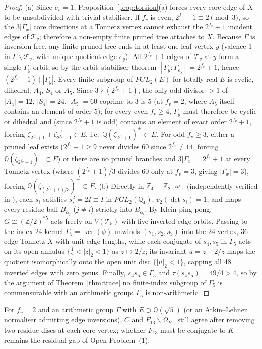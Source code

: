 \documentclass[11pt]{amsart}
\numberwithin{equation}{section}
\theoremstyle{plain}
\theoremstyle{definition}\newtheorem{definition}[theorem]{Definition}
\theoremstyle{remark}\newtheorem{remark}[theorem]{Remark}
\newcommand{\Z}{\mathbb{Z}}\newcommand{\Q}{\mathbb{Q}}\newcommand{\C}{\mathbb{C}}\newcommand{\F}{\mathbb{F}}\newcommand{\R}{\mathbb{R}}
\begin{document}
\begin{proof}
(a) Since $e_v=1$, Proposition~\ref{prop:torsion}(a) forces every core edge of $X$ to be unsubdivided with trivial stabiliser. If $f_v$ is even, $2^{f_v}+1\equiv2\pmod3$, so the $3|\Gamma_x|$ core directions at a Tonnetz vertex cannot exhaust the $2^{f_v}+1$ incident edges of $\mathcal T_v$; therefore a non-empty finite pruned tree attaches to $X$. Because $\Gamma$ is inversion-free, any finite pruned tree ends in at least one leaf vertex $y$ (valence 1 in $\Gamma\backslash\mathcal T_v$, with unique quotient edge $e_y$). All $2^{f_v}+1$ edges of $\mathcal T_v$ at $y$ form a single $\Gamma_y$-orbit, so by the orbit--stabiliser theorem $[\Gamma_y:\Gamma_{e_y}]=2^{f_v}+1$, hence $(2^{f_v}+1)\mid|\Gamma_y|$. Every finite subgroup of $PGL_2(E)$ for totally real $E$ is cyclic, dihedral, $A_4$, $S_4$ or $A_5$. Since $3\nmid(2^{f_v}+1)$, the only odd divisor $>1$ of $|A_4|=12$, $|S_4|=24$, $|A_5|=60$ coprime to $3$ is $5$ (at $f_v=2$, where $A_5$ itself contains an element of order $5$); for every even $f_v\ge4$, $\Gamma_y$ must therefore be cyclic or dihedral and (since $2^{f_v}+1$ is odd) contains an element of exact order $2^{f_v}+1$, forcing $\zeta_{2^{f_v}+1}+\zeta_{2^{f_v}+1}^{-1}\in E$, i.e.\ $\Q(\zeta_{2^{f_v}+1})^+\subset E$. For odd $f_v\ge3$, either a pruned leaf exists ($2^{f_v}+1\ge9$ never divides $60$ since $2^{f_v}\neq14$, forcing $\Q(\zeta_{2^{f_v}+1})^+\subset E$) or there are no pruned branches and $3|\Gamma_x|=2^{f_v}+1$ at every Tonnetz vertex (where $(2^{f_v}+1)/3$ divides $60$ only at $f_v=3$, giving $|\Gamma_x|=3$), forcing $\Q(\zeta_{(2^{f_v}+1)/3})^+\subset E$.
(b) Directly in $\Z_4=\Z_2[\omega]$ (independently verified in ), each $s_i$ satisfies $s_i^2=2I\equiv I$ in $PGL_2(\Q_4)$, $v_2(\det s_i)=1$, and maps every residue ball $B_{\alpha_j}$ ($j\ne i$) strictly into $B_{\alpha_i}$. By Klein ping-pong, $G\cong(\Z/2)^{*5}$ acts freely on $V(\mathcal T_5)$ with five inverted edge orbits. Passing to the index-24 kernel $\Gamma_5=\ker(\phi)$ unwinds $(s_1,s_2,s_3)$ into the 24-vertex, 36-edge Tonnetz $X$ with unit edge lengths, while each conjugate of $s_4,s_5$ in $\Gamma_5$ acts on its open annulus $\{\tfrac12<|z|_2<1\}$ as $z\mapsto2/z$; its invariant $u=z+2/z$ maps the quotient isomorphically onto the open unit disc $\{|u|_2<1\}$, capping all 48 inverted edges with zero genus. Finally, $s_4s_5\in\Gamma_5$ and $\tau(s_4s_5)=49/4>4$, so by the argument of Theorem~\ref{thm:trace} no finite-index subgroup of $\Gamma_5$ is commensurable with an arithmetic group: $\Gamma_5$ is non-arithmetic.
\end{proof}
For $f_v=2$ and an arithmetic group $\Gamma$ with $E\supset\Q(\sqrt5)$ (or an Atkin--Lehner normaliser admitting edge inversions), $C$ and $F_{13}\backslash\Omega_{F_{13}}$ still agree after removing two residue discs at each core vertex; whether $F_{13}$ must be conjugate to $K$ remains the residual gap of Open Problem~(1).
\end{document}
